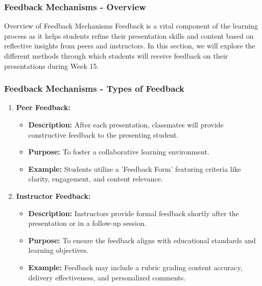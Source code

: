 \documentclass[aspectratio=169]{beamer}
\begin{document}
\begin{frame}[fragile]
    \frametitle{Feedback Mechanisms - Overview}
    \begin{block}{Overview of Feedback Mechanisms}
        Feedback is a vital component of the learning process as it helps students refine their presentation skills and content based on reflective insights from peers and instructors. 
        In this section, we will explore the different methods through which students will receive feedback on their presentations during Week 15.
    \end{block}
\end{frame}

\begin{frame}[fragile]
    \frametitle{Feedback Mechanisms - Types of Feedback}
    \begin{enumerate}
        \item \textbf{Peer Feedback:}
          \begin{itemize}
              \item \textbf{Description:} After each presentation, classmates will provide constructive feedback to the presenting student. 
              \item \textbf{Purpose:} To foster a collaborative learning environment. 
              \item \textbf{Example:} Students utilize a 'Feedback Form' featuring criteria like clarity, engagement, and content relevance.
          \end{itemize}
        
        \item \textbf{Instructor Feedback:}
          \begin{itemize}
              \item \textbf{Description:} Instructors provide formal feedback shortly after the presentation or in a follow-up session.
              \item \textbf{Purpose:} To ensure the feedback aligns with educational standards and learning objectives.
              \item \textbf{Example:} Feedback may include a rubric grading content accuracy, delivery effectiveness, and personalized comments.
          \end{itemize}
    \end{enumerate}
\end{frame}
\end{document}
